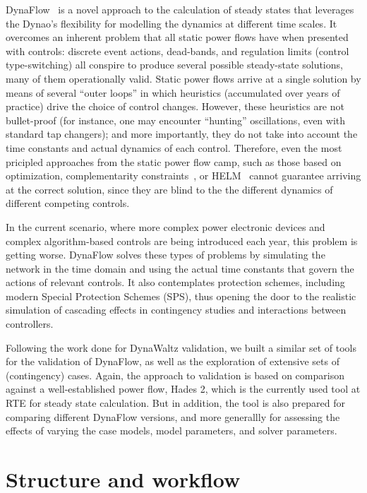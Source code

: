 \documentclass[conference]{IEEEtran}
\newcommand{\Dynawo}{Dyna\textomega o} %
\begin{document}
DynaFlow~\cite{Cossart21} is a novel approach to the calculation of steady states
that leverages the \Dynawo's flexibility for modelling the dynamics at different
time scales. It overcomes an inherent problem that all static power flows have
when presented with controls: discrete event actions, dead-bands, and regulation
limits (control type-switching) all conspire to produce several possible
steady-state solutions, many of them operationally valid.  Static power flows
arrive at a single solution by means of several ``outer loops'' in which
heuristics (accumulated over years of practice) drive the choice of control
changes. However, these heuristics are not bullet-proof (for instance, one may
encounter ``hunting'' oscillations, even with standard tap changers); and more
importantly, they do not take into account the time constants and actual
dynamics of each control. Therefore, even the most pricipled approaches from the
static power flow camp, such as those based on optimization\cite{Ju20},
complementarity constraints~\cite{Murray15}, or HELM~\cite{Trias18} cannot
guarantee arriving at the correct solution, since they are blind to the the
different dynamics of different competing controls.

In the current scenario, where more complex power electronic devices and complex
algorithm-based controls are being introduced each year, this problem is getting
worse. DynaFlow solves these types of problems by simulating the network in the
time domain and using the actual time constants that govern the actions of
relevant controls. It also contemplates protection schemes, including modern
Special Protection Schemes (SPS), thus opening the door to the realistic
simulation of cascading effects in contingency studies and interactions between controllers.

Following the work done for DynaWaltz validation, we built a similar set of
tools for the validation of DynaFlow, as well as the exploration of extensive
sets of (contingency) cases.  Again, the approach to validation is based on
comparison against a well-established power flow, Hades 2, which is the currently used tool at RTE for steady state calculation. But in
addition, the tool is also prepared for comparing different DynaFlow versions,
and more generallly for assessing the effects of varying the case models, model
parameters, and solver parameters.


\section{Structure and workflow}
\end{document}
